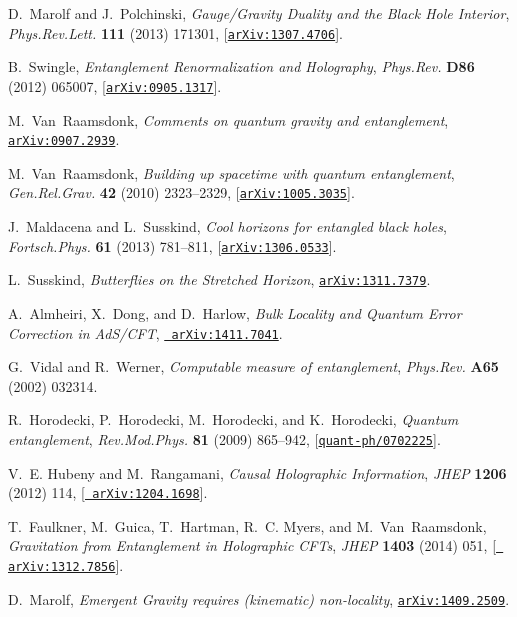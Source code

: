 \documentclass[12pt]{article}
\begin{document}
\begin{thebibliography}{100}
D.~Marolf and J.~Polchinski, {\it {Gauge/Gravity Duality and the Black Hole
  Interior}},  {\em Phys.Rev.Lett.} {\bf 111} (2013) 171301,
  [\href{http://xxx.lanl.gov/abs/1307.4706}{{\tt arXiv:1307.4706}}].

B.~Swingle, {\it {Entanglement Renormalization and Holography}},  {\em
  Phys.Rev.} {\bf D86} (2012) 065007,
  [\href{http://xxx.lanl.gov/abs/0905.1317}{{\tt arXiv:0905.1317}}].

M.~Van~Raamsdonk, {\it {Comments on quantum gravity and entanglement}},
  \href{http://xxx.lanl.gov/abs/0907.2939}{{\tt arXiv:0907.2939}}.

M.~Van~Raamsdonk, {\it {Building up spacetime with quantum entanglement}},
  {\em Gen.Rel.Grav.} {\bf 42} (2010) 2323--2329,
  [\href{http://xxx.lanl.gov/abs/1005.3035}{{\tt arXiv:1005.3035}}].

J.~Maldacena and L.~Susskind, {\it {Cool horizons for entangled black holes}},
  {\em Fortsch.Phys.} {\bf 61} (2013) 781--811,
  [\href{http://xxx.lanl.gov/abs/1306.0533}{{\tt arXiv:1306.0533}}].

L.~Susskind, {\it {Butterflies on the Stretched Horizon}},
  \href{http://xxx.lanl.gov/abs/1311.7379}{{\tt arXiv:1311.7379}}.

A.~Almheiri, X.~Dong, and D.~Harlow, {\it {Bulk Locality and Quantum Error
  Correction in AdS/CFT}},  \href{http://xxx.lanl.gov/abs/1411.7041}{{\tt
  arXiv:1411.7041}}.

G.~Vidal and R.~Werner, {\it {Computable measure of entanglement}},  {\em
  Phys.Rev.} {\bf A65} (2002) 032314.

R.~Horodecki, P.~Horodecki, M.~Horodecki, and K.~Horodecki, {\it {Quantum
  entanglement}},  {\em Rev.Mod.Phys.} {\bf 81} (2009) 865--942,
  [\href{http://xxx.lanl.gov/abs/quant-ph/0702225}{{\tt quant-ph/0702225}}].

V.~E. Hubeny and M.~Rangamani, {\it {Causal Holographic Information}},  {\em
  JHEP} {\bf 1206} (2012) 114, [\href{http://xxx.lanl.gov/abs/1204.1698}{{\tt
  arXiv:1204.1698}}].

T.~Faulkner, M.~Guica, T.~Hartman, R.~C. Myers, and M.~Van~Raamsdonk, {\it
  {Gravitation from Entanglement in Holographic CFTs}},  {\em JHEP} {\bf 1403}
  (2014) 051, [\href{http://xxx.lanl.gov/abs/1312.7856}{{\tt
  arXiv:1312.7856}}].

D.~Marolf, {\it {Emergent Gravity requires (kinematic) non-locality}},
  \href{http://xxx.lanl.gov/abs/1409.2509}{{\tt arXiv:1409.2509}}.

\end{thebibliography}\endgroup
\end{document}
